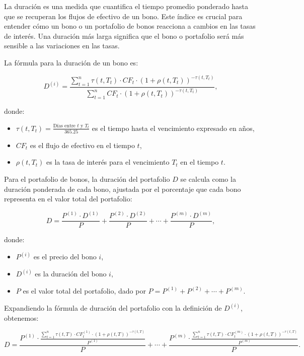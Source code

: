 \documentclass[12pt]{article}
\begin{document}
La duración es una medida que cuantifica el tiempo promedio ponderado hasta que se recuperan los flujos de efectivo de un bono. Este índice es crucial para entender cómo un bono o un portafolio de bonos reacciona a cambios en las tasas de interés. Una duración más larga significa que el bono o portafolio será más sensible a las variaciones en las tasas.

La fórmula para la duración de un bono es:

\[
D^{(i)} = \frac{\sum_{t=1}^n \tau(t, T_t) \cdot CF_t \cdot (1 + \rho(t, T_t))^{-\tau(t, T_t)}}{\sum_{t=1}^n CF_t \cdot (1 + \rho(t, T_t))^{-\tau(t, T_t)}},
\]

donde:
\begin{itemize}
    \item \( \tau(t, T_t) = \frac{\text{Días entre } t \text{ y } T_t}{365.25} \) es el tiempo hasta el vencimiento expresado en años,
    \item \( CF_t \) es el flujo de efectivo en el tiempo \( t \),
    \item \( \rho(t, T_t) \) es la tasa de interés para el vencimiento \( T_t \) en el tiempo \( t \).
\end{itemize}

Para el portafolio de bonos, la duración del portafolio \( D \) se calcula como la duración ponderada de cada bono, ajustada por el porcentaje que cada bono representa en el valor total del portafolio:

\[
D = \frac{P^{(1)} \cdot D^{(1)}}{P} + \frac{P^{(2)} \cdot D^{(2)}}{P} + \cdots + \frac{P^{(m)} \cdot D^{(m)}}{P},
\]

donde:
\begin{itemize}
    \item \( P^{(i)} \) es el precio del bono \( i \),
    \item \( D^{(i)} \) es la duración del bono \( i \),
    \item \( P \) es el valor total del portafolio, dado por \( P = P^{(1)} + P^{(2)} + \cdots + P^{(m)} \).
\end{itemize}

Expandiendo la fórmula de duración del portafolio con la definición de \( D^{(i)} \), obtenemos:

\[
D = \frac{P^{(1)} \cdot \frac{\sum_{t=1}^n \tau(t, T) \cdot CF_t^{(1)} \cdot (1 + \rho(t, T))^{-\tau(t, T)}}{P^{(1)}}}{P} + \cdots + \frac{P^{(m)} \cdot \frac{\sum_{t=1}^n \tau(t, T) \cdot CF_t^{(m)} \cdot (1 + \rho(t, T))^{-\tau(t, T)}}{P^{(m)}}}{P}.
\]
\end{document}
